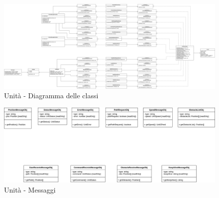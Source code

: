 	\begin{landscape}
		\begin{figure}[h!]
			\includegraphics[width=25.5cm]{img/unit_architettura2.png}
			\caption{Unità - Diagramma delle classi}
		\end{figure}
	\end{landscape}
	
	
	\begin{landscape}
		\begin{figure}[H]
			\centering
			\includegraphics[width=25.5cm]{img/unit_messaggi.png}
			\caption{Unità - Messaggi}
		\end{figure}
	\end{landscape}
